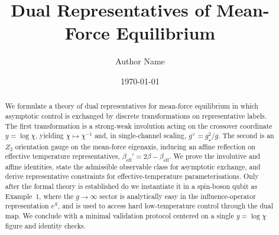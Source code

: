 \documentclass[aps,prl,twocolumn,superscriptaddress,floatfix]{revtex4-2}
\theoremstyle{definition}
\theoremstyle{remark}
\newcommand{\beff}{\beta_{\mathrm{eff}}}
\begin{document}
\title{Dual Representatives of Mean-Force Equilibrium}
\author{Author Name}
\date{\today}

\begin{abstract}
We formulate a theory of dual representatives for mean-force equilibrium in which asymptotic control
is exchanged by discrete transformations on representative labels. The first transformation is a
strong-weak involution acting on the crossover coordinate \(y=\log\chi\), yielding
\(\chi\mapsto\chi^{-1}\) and, in single-channel scaling, \(g^\vee=g_\star^2/g\). The second is an
\(Z_2\) orientation gauge on the mean-force eigenaxis, inducing an affine reflection on effective
temperature representatives, \(\beff'=2\beta-\beff\). We prove the involutive and affine identities,
state the admissible observable class for asymptotic exchange, and derive representative constraints
for effective-temperature parameterisations. Only after the formal theory is established do we
instantiate it in a spin-boson qubit as Example~1, where the \(g\to\infty\) sector is analytically
easy in the influence-operator representation \(e^S\), and is used to access hard low-temperature
control through the dual map. We conclude with a minimal validation protocol centered on a single
\(y=\log\chi\) figure and identity checks.
\end{abstract}

\maketitle











\appendix



\end{document}
